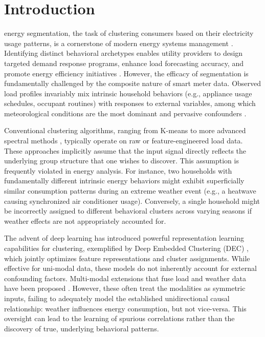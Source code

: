 \documentclass[journal]{IEEEtran}
\begin{document}
\section{Introduction}
 energy segmentation, the task of clustering consumers based on their electricity usage patterns, is a cornerstone of modern energy systems management \cite{smart_grid_review}. Identifying distinct behavioral archetypes enables utility providers to design targeted demand response programs, enhance load forecasting accuracy, and promote energy efficiency initiatives \cite{demand_response_survey}. However, the efficacy of segmentation is fundamentally challenged by the composite nature of smart meter data. Observed load profiles invariably mix intrinsic household behaviors (e.g., appliance usage schedules, occupant routines) with responses to external variables, among which meteorological conditions are the most dominant and pervasive confounders \cite{weather_normalization_energy}.

Conventional clustering algorithms, ranging from K-means \cite{kmeans_clustering} to more advanced spectral methods \cite{spectral_clustering}, typically operate on raw or feature-engineered load data. These approaches implicitly assume that the input signal directly reflects the underlying group structure that one wishes to discover. This assumption is frequently violated in energy analysis. For instance, two households with fundamentally different intrinsic energy behaviors might exhibit superficially similar consumption patterns during an extreme weather event (e.g., a heatwave causing synchronized air conditioner usage). Conversely, a single household might be incorrectly assigned to different behavioral clusters across varying seasons if weather effects are not appropriately accounted for.

The advent of deep learning has introduced powerful representation learning capabilities for clustering, exemplified by Deep Embedded Clustering (DEC) \cite{deep_embedding_clustering_xie}, which jointly optimizes feature representations and cluster assignments. While effective for uni-modal data, these models do not inherently account for external confounding factors. Multi-modal extensions that fuse load and weather data have been proposed \cite{multi_modal_deep_learning_survey}. However, these often treat the modalities as symmetric inputs, failing to adequately model the established unidirectional causal relationship: weather influences energy consumption, but not vice-versa. This oversight can lead to the learning of spurious correlations rather than the discovery of true, underlying behavioral patterns.
\end{document}
